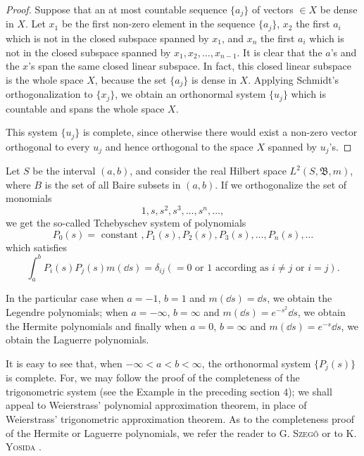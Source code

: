 \begin{proof}
 Suppose that an at most countable sequence $\{a_j\}$ of vectors $\in X$ be dense in $X$. Let $x_1$ be the first non-zero element in the sequence $\{a_j\}$, $x_2$ the first $a_i$ which is not in the closed subspace spanned by $x_1$, and $x_n$ the first $a_i$ which is not in the closed subspace spanned by $x_1, x_2, \ldots, x_{n-1}$. It is clear that the $a$'s and the $x$'s span the same closed linear subspace. In fact, this closed linear subspace is the whole space $X$, because the set $\{a_j\}$ is dense in $X$. Applying Schmidt's orthogonalization to $\{x_j\}$, we obtain an orthonormal system $\{u_j\}$ which is countable and spans the whole space $X$. 


This system $\{u_{j}\}$ is complete, since otherwise there would exist a non-zero vector orthogonal to every $u_{j}$ and hence orthogonal to the space $X$ spanned by $u_{j}$'s.
\end{proof}

\begin{examplen} Let $S$ be the interval $(a, b)$, and consider the real Hilbert space $L^{2}(S, \mathfrak{B}, m)$, where $B$ is the set of all Baire subsets in $(a, b)$. If we orthogonalize the set of monomials 
\[
1, s, s ^{2}, s ^{3}, \dots , s ^{n}, \dots ,
\]
we get the so-called Tchebyschev system of polynomials 
\[
P _{0} (s) = \text{ constant }, P _{1} (s), P _{2} (s), P _{3} (s), \dots , P _{n} (s), \dots
\]
which satisfies 
\[
\int_{a} ^{b} P _{i} (s) P _{j} (s) m (\dd s) = \delta_{ij} (= 0 \text{ or } 1 \text{ according as } i \neq j \text{ or } i = j).
\]

In the particular case when $a = -1$, $b = 1$ and $m(\dd s) = \dd s$, we obtain the Legendre polynomials; when $a = -\infty$, $b = \infty$ and $m(\dd s) = e^{-s^2} \dd s$, we obtain the Hermite polynomials and finally when $a = 0$, $b = \infty$ and $m(\dd s) = e^{-s} \dd s$, we obtain the Laguerre polynomials. 
\end{examplen}

It is easy to see that, when $-\infty < a < b < \infty$, the orthonormal system $\{P_{j}(s)\}$ is complete. For, we may follow the proof of the completeness of the trigonometric system (see the Example in the preceding section $4$); we shall appeal to Weierstrass' polynomial approximation theorem, in place of Weierstrass' trigonometric approximation theorem. As to the completeness proof of the Hermite or Laguerre polynomials, we refer the reader to G. \textsc{Szegő} \cite{szego313} or to K. \textsc{Yosida} \cite{yosida344}. 


